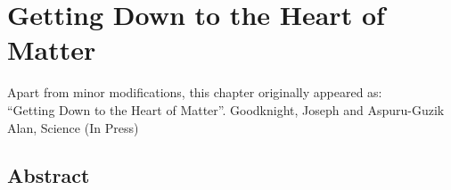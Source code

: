 \chapter{Getting Down to the Heart of Matter}\label{ch:sciencePerspective}
\thispagestyle{plain}
\vspace{-.5cm}

\noindent Apart from minor modifications, this chapter originally appeared as:\newline\\
\ssp ``Getting Down to the Heart of Matter''.
Goodknight, Joseph and Aspuru-Guzik Alan, Science (In Press)

\section*{Abstract}
    \dsp
    


